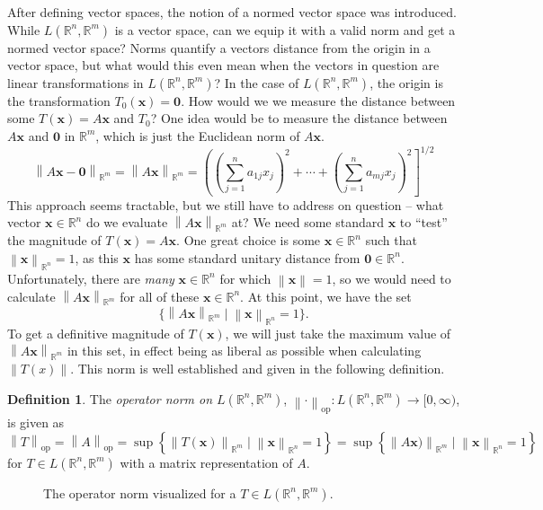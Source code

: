 \documentclass{article}
\newcommand{\R}{\mathbb{R}}
\newcommand{\x}{\mathbf{x}}
\newcommand{\ze}{\mathbf{0}}
\newcommand{\norm}[1]{\left\lVert#1\right\rVert}
\theoremstyle{definition}
\newtheorem{definition}{Definition}[section]
\begin{document}
	After defining vector spaces, the notion of a normed vector space was introduced. While $ L(\R^n,\R^m) $ is a vector space, can we equip it with a valid norm and get a normed vector space? Norms quantify a vectors distance from the origin in a vector space, but what would this even mean when the vectors in question are linear transformations in $ L(\R^n, \R^m) $? In the case of $ L(\R^n,\R^m) $, the origin is the transformation $ T_0(\x)=\ze $. How would we we measure the distance between some $ T(\x)=A\x $ and $ T_0 $? One idea would be to measure the distance between $ A\x $ and $ \ze $ in $ \R^m $, which is just the Euclidean norm of $ A\x $.
	$$ \norm{A\x - \ze }_{\R^m}= \norm{A\x}_{\R^m} = \left(\left(\sum_{j=1}^{n}a_{1j}x_j\right)^2 + \cdots + \left(\sum_{j=1}^{n}a_{mj}x_j \right)^2\right]^{1/2}$$
	This approach seems tractable, but we still have to address on question -- what vector $ \x\in\R^n $ do we evaluate $ \norm{A\x}_{\R^m} $ at? We need some standard $ \x $ to ``test'' the magnitude of $ T(\x)=A\x $. One great choice is some $ \x\in\R^n $ such that $ \norm{\x}_{\R^n} = 1 $, as this $ \x $ has some standard unitary distance from $ \ze \in \R^n $. Unfortunately, there are \textit{many} $ \x\in\R^n $ for which $ \norm{\x}=1 $, so we would need to calculate $ \norm{A\x}_{\R^m} $ for all of these $ \x\in\R^n $. At this point, we have the set $$ \{\norm{A\x}_{\R^m}\mid \norm{\x}_{\R^n} = 1\} .$$ To get a definitive magnitude of $ T(\x) $, we will just take the maximum value of $ \norm{A\x}_{\R^m} $ in this set, in effect being as liberal as possible when calculating $ \norm{T(x)} $. This norm is well established and given in the following definition.  
	\begin{definition}\label{def8.11}
		The \textit{\color{red}operator norm on $ L(\R^n,\R^m) $}, $ \norm{\cdot}_\text{op}:L(\R^n,\R^m)\to [0,\infty) $, is given as 
		$$ \norm{T}_\text{op} = \norm{A}_\text{op}= \sup\left\{\norm{T(\x)}_{\R^m}\mid \norm{\x}_{\R^n} = 1\right\} = \sup\left\{\norm{A\x)}_{\R^m}\mid \norm{\x}_{\R^n} = 1\right\}$$
		for $ T\in L(\R^n,\R^m) $ with a matrix representation of $ A $. 
	\end{definition}
	\begin{figure}[h!]
		\centering
		\caption{The operator norm visualized for a $ T\in L(\R^n,\R^m) $.}
	\end{figure}
	
\end{document}
